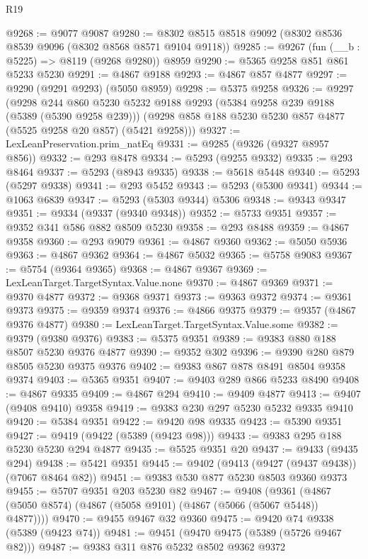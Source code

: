 \begin{lexlean}{R19}
\begin{coremodule}
@9268 := @9077 @9087
@9280 := @8302 @8515 @8518 @9092 (@8302 @8536 @8539 @9096 (@8302 @8568 @8571 @9104 @9118))
@9285 := @9267 (fun (__b : @5225) => @8119 (@9268 @9280)) @8959
@9290 := @5365 @9258 @851 @861 @5233 @5230
@9291 := @4867 @9188
@9293 := @4867 @857 @4877
@9297 := @9290 (@9291 @9293) (@5050 @8959)
@9298 := @5375 @9258
@9326 := @9297
    (@9298
      @244
      @860
      @5230
      @5232
      @9188
      @9293
      (@5384 @9258 @239 @9188 (@5389 (@5390 @9258 @239)))
      (@9298 @858 @188 @5230 @5230 @857 @4877 (@5525 @9258 @20 @857) (@5421 @9258)))
@9327 := LexLeanPreservation.prim_natEq
@9331 := @9285 (@9326 (@9327 @8957 @856))
@9332 := @293 @8478
@9334 := @5293 (@9255 @9332)
@9335 := @293 @8464
@9337 := @5293 (@8943 @9335)
@9338 := @5618 @5448
@9340 := @5293 (@5297 @9338)
@9341 := @293 @5452
@9343 := @5293 (@5300 @9341)
@9344 := @1063 @6839
@9347 := @5293 (@5303 @9344) @5306
@9348 := @9343 @9347
@9351 := @9334 (@9337 (@9340 @9348))
@9352 := @5733 @9351
@9357 := @9352 @341 @586 @882 @8509 @5230
@9358 := @293 @8488
@9359 := @4867 @9358
@9360 := @293 @9079
@9361 := @4867 @9360
@9362 := @5050 @5936
@9363 := @4867 @9362
@9364 := @4867 @5032
@9365 := @5758 @9083
@9367 := @5754 (@9364 @9365)
@9368 := @4867 @9367
@9369 := LexLeanTarget.TargetSyntax.Value.none
@9370 := @4867 @9369
@9371 := @9370 @4877
@9372 := @9368 @9371
@9373 := @9363 @9372
@9374 := @9361 @9373
@9375 := @9359 @9374
@9376 := @4866 @9375
@9379 := @9357 (@4867 @9376 @4877)
@9380 := LexLeanTarget.TargetSyntax.Value.some
@9382 := @9379 (@9380 @9376)
@9383 := @5375 @9351
@9389 := @9383 @880 @188 @8507 @5230 @9376 @4877
@9390 := @9352 @302
@9396 := @9390 @280 @879 @8505 @5230 @9375 @9376
@9402 := @9383 @867 @878 @8491 @8504 @9358 @9374
@9403 := @5365 @9351
@9407 := @9403 @289 @866 @5233 @8490
@9408 := @4867 @9335
@9409 := @4867 @294
@9410 := @9409 @4877
@9413 := @9407 (@9408 @9410) @9358
@9419 := @9383 @230 @297 @5230 @5232 @9335 @9410
@9420 := @5384 @9351
@9422 := @9420 @98 @9335
@9423 := @5390 @9351
@9427 := @9419 (@9422 (@5389 (@9423 @98)))
@9433 := @9383 @295 @188 @5230 @5230 @294 @4877
@9435 := @5525 @9351 @20
@9437 := @9433 (@9435 @294)
@9438 := @5421 @9351
@9445 := @9402 (@9413 (@9427 (@9437 @9438)) (@7067 @8464 @82))
@9451 := @9383 @530 @877 @5230 @8503 @9360 @9373
@9455 := @5707 @9351 @203 @5230 @82
@9467 := @9408
    (@9361 (@4867 (@5050 @8574) (@4867 (@5058 @9101) (@4867 (@5066 (@5067 @5448)) @4877))))
@9470 := @9455 @9467 @32 @9360
@9475 := @9420 @74 @9338 (@5389 (@9423 @74))
@9481 := @9451 (@9470 @9475 (@5389 (@5726 @9467 @82)))
@9487 := @9383 @311 @876 @5232 @8502 @9362 @9372

\end{coremodule}
\end{lexlean}
